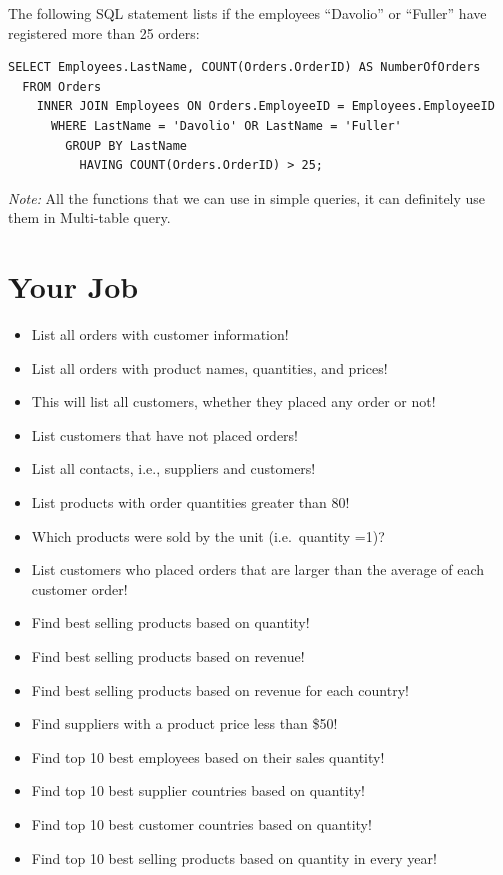 \documentclass[
]{book}
\providecommand{\tightlist}{%
  \setlength{\itemsep}{0pt}\setlength{\parskip}{0pt}}
\begin{document}
The following SQL statement lists if the employees ``Davolio'' or ``Fuller'' have registered more than 25 orders:

\begin{verbatim}
SELECT Employees.LastName, COUNT(Orders.OrderID) AS NumberOfOrders
  FROM Orders
    INNER JOIN Employees ON Orders.EmployeeID = Employees.EmployeeID
      WHERE LastName = 'Davolio' OR LastName = 'Fuller'
        GROUP BY LastName
          HAVING COUNT(Orders.OrderID) > 25;
\end{verbatim}

\emph{Note:} All the functions that we can use in simple queries, it can definitely use them in Multi-table query.

\hypertarget{your-job-4}{%
\section{Your Job}\label{your-job-4}}

\begin{itemize}
\tightlist
\item
  List all orders with customer information!
\item
  List all orders with product names, quantities, and prices!
\item
  This will list all customers, whether they placed any order or not!
\item
  List customers that have not placed orders!
\item
  List all contacts, i.e., suppliers and customers!
\item
  List products with order quantities greater than 80!
\item
  Which products were sold by the unit (i.e.~quantity =1)?
\item
  List customers who placed orders that are larger than the average of each customer order!
\item
  Find best selling products based on quantity!
\item
  Find best selling products based on revenue!
\item
  Find best selling products based on revenue for each country!
\item
  Find suppliers with a product price less than \$50!
\item
  Find top 10 best employees based on their sales quantity!
\item
  Find top 10 best supplier countries based on quantity!
\item
  Find top 10 best customer countries based on quantity!
\item
  Find top 10 best selling products based on quantity in every year!
\end{itemize}
\end{document}
